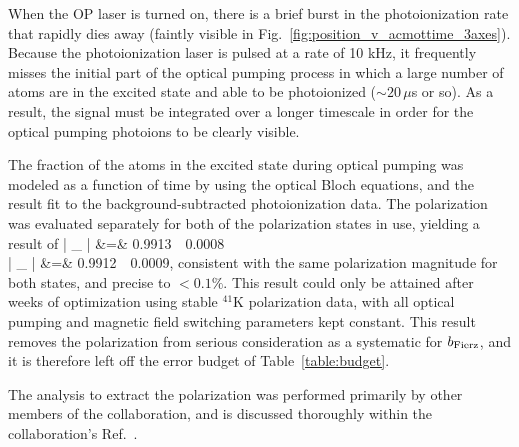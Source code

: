 When the \ac{OP} laser is turned on, there is a brief burst in the photoionization rate that rapidly dies away (faintly visible in Fig.~\ref{fig:position_v_acmottime_3axes}).  Because the photoionization laser is pulsed at a rate of 10 kHz, it frequently misses the initial part of the optical pumping process in which a large number of atoms are in the excited state and able to be photoionized ($\sim 20\,\mu$s or so).  As a result, the signal must be integrated over a longer timescale in order for the optical pumping photoions to be clearly visible.

The fraction of the atoms in the excited state during optical pumping was modeled as a function of time by using the optical Bloch equations, and the result fit to the background-subtracted photoionization data.  The polarization was evaluated separately for both of the polarization states in use, yielding a result of
\bea
| \vecP_{\bm{+}} | &=& 0.9913 \,\pm\, 0.0008
\\
| \vecP_{\bm{-}} | &=& 0.9912 \,\pm\, 0.0009, 
\eea
consistent with the same polarization magnitude for both states, and precise to \mbox{$<0.1\%$}. This result could only be attained after weeks of optimization using \mbox{stable} $^{41}$K polarization data, with all optical pumping and magnetic field switching parameters kept constant.  This result removes the polarization from serious consideration as a systematic for $b_{\mathrm{Fierz}}$, and it is therefore left off the error budget of Table~\ref{table:budget}.

The analysis to extract the polarization was performed primarily by other members of the collaboration, and is discussed thoroughly within the collaboration's Ref.~\cite{ben_OP}.



